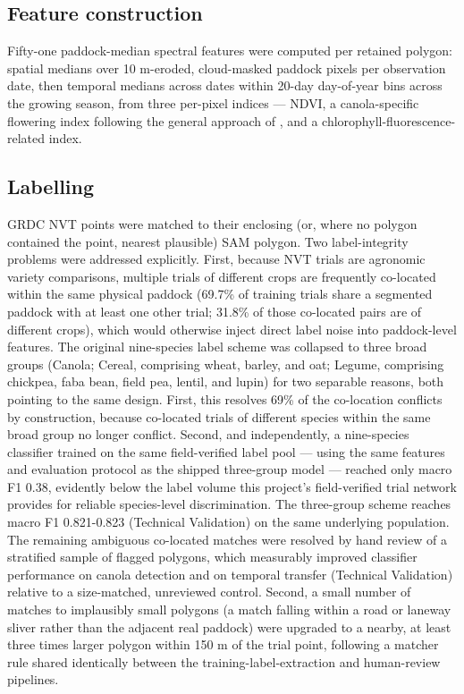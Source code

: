 \subsection*{Feature construction}\label{feature-construction}

Fifty-one paddock-median spectral features were computed per retained polygon: spatial medians over 10 m-eroded, cloud-masked paddock pixels per observation date, then temporal medians across dates within 20-day day-of-year bins across the growing season, from three per-pixel indices --- NDVI, a canola-specific flowering index following the general approach of \citet{ashourloo2019canola}, and a chlorophyll-fluorescence-related index.

\subsection*{Labelling}\label{labelling}

GRDC NVT points were matched to their enclosing (or, where no polygon contained the point, nearest plausible) SAM polygon. Two label-integrity problems were addressed explicitly. First, because NVT trials are agronomic variety comparisons, multiple trials of different crops are frequently co-located within the same physical paddock (69.7\% of training trials share a segmented paddock with at least one other trial; 31.8\% of those co-located pairs are of different crops), which would otherwise inject direct label noise into paddock-level features. The original nine-species label scheme was collapsed to three broad groups (Canola; Cereal, comprising wheat, barley, and oat; Legume, comprising chickpea, faba bean, field pea, lentil, and lupin) for two separable reasons, both pointing to the same design. First, this resolves 69\% of the co-location conflicts by construction, because co-located trials of different species within the same broad group no longer conflict. Second, and independently, a nine-species classifier trained on the same field-verified label pool --- using the same features and evaluation protocol as the shipped three-group model --- reached only macro F1 0.38, evidently below the label volume this project's field-verified trial network provides for reliable species-level discrimination. The three-group scheme reaches macro F1 0.821-0.823 (Technical Validation) on the same underlying population. The remaining ambiguous co-located matches were resolved by hand review of a stratified sample of flagged polygons, which measurably improved classifier performance on canola detection and on temporal transfer (Technical Validation) relative to a size-matched, unreviewed control. Second, a small number of matches to implausibly small polygons (a match falling within a road or laneway sliver rather than the adjacent real paddock) were upgraded to a nearby, at least three times larger polygon within 150 m of the trial point, following a matcher rule shared identically between the training-label-extraction and human-review pipelines.

